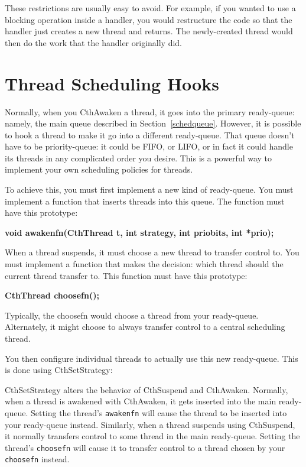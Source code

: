 These restrictions are usually easy to avoid.  For example, if you
wanted to use a blocking operation inside a \converse{} handler, you
would restructure the code so that the handler just creates a new
thread and returns.  The newly-created thread would then do the work
that the handler originally did.

\section{Thread Scheduling Hooks}

Normally, when you CthAwaken a thread, it goes into the primary
ready-queue: namely, the main \converse{} queue described in Section~\ref{schedqueue}.
However, it is possible to hook a thread to make
it go into a different ready-queue.  That queue doesn't have to be
priority-queue: it could be FIFO, or LIFO, or in fact it could handle
its threads in any complicated order you desire.  This is a powerful
way to implement your own scheduling policies for threads.

To achieve this, you must first implement a new kind of ready-queue.
You must implement a function that inserts threads into this queue.
The function must have this prototype:

{\bf void awakenfn(CthThread t, int strategy, int priobits, int *prio);}

When a thread suspends, it must choose a new thread to transfer control
to.  You must implement a function that makes the decision: which thread
should the current thread transfer to.  This function must have this
prototype:

{\bf CthThread choosefn();}

Typically, the choosefn would choose a thread from your ready-queue.
Alternately, it might choose to always transfer control to a central
scheduling thread.

You then configure individual threads to actually use this new
ready-queue.  This is done using CthSetStrategy:


CthSetStrategy alters the behavior of CthSuspend and CthAwaken.
Normally, when a thread is awakened with CthAwaken, it gets inserted
into the main ready-queue.  Setting the thread's {\tt awakenfn} will
cause the thread to be inserted into your ready-queue instead.
Similarly, when a thread suspends using CthSuspend, it normally
transfers control to some thread in the main ready-queue.  Setting the
thread's {\tt choosefn} will cause it to transfer control to a thread
chosen by your {\tt choosefn} instead.

